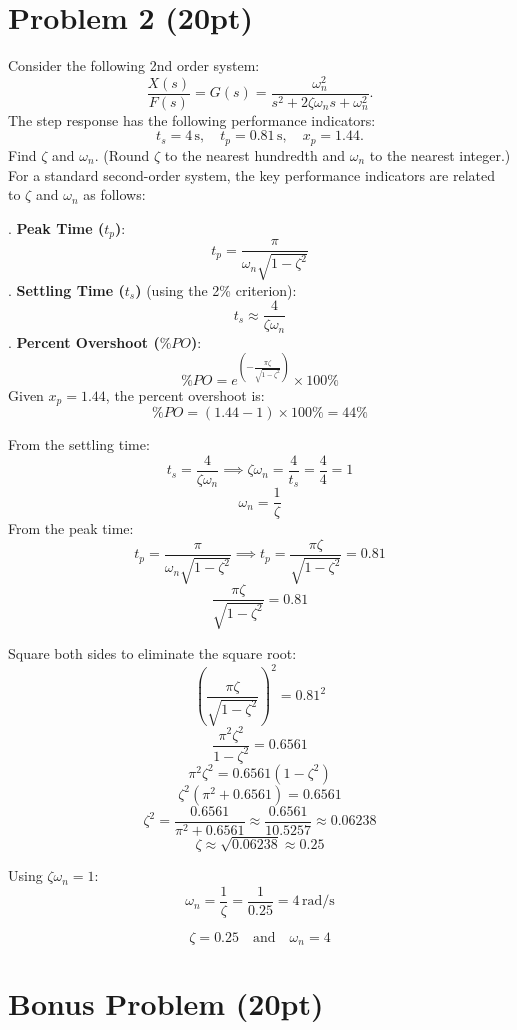 \documentclass{article}
\begin{document}
\section*{Problem 2 (20pt)}

Consider the following 2nd order system:
\[
\frac{X(s)}{F(s)} = G(s) = \frac{\omega_n^2}{s^2 + 2\zeta \omega_n s + \omega_n^2}.
\]
The step response has the following performance indicators: 
\[
t_s = 4 \, \text{s}, \quad t_p = 0.81 \, \text{s}, \quad x_p = 1.44.
\]
Find \( \zeta \) and \( \omega_n \). (Round \( \zeta \) to the nearest hundredth and \( \omega_n \) to the nearest integer.)
\newline\newline
For a standard second-order system, the key performance indicators are related to \( \zeta \) and \( \omega_n \) as follows:

. \textbf{Peak Time (\( t_p \))}:
   \[
   t_p = \frac{\pi}{\omega_n \sqrt{1 - \zeta^2}}
   \]
. \textbf{Settling Time (\( t_s \))} (using the 2\% criterion):
   \[
   t_s \approx \frac{4}{\zeta \omega_n}
   \]
. \textbf{Percent Overshoot (\( \%PO \))}:
   \[
   \%PO = e^{\left(-\frac{\pi \zeta}{\sqrt{1 - \zeta^2}}\right)} \times 100\%
   \]
   Given \( x_p = 1.44 \), the percent overshoot is:
   \[
   \%PO = (1.44 - 1) \times 100\% = 44\%
   \]

\noindent
From the settling time:
\[
t_s = \frac{4}{\zeta \omega_n} \implies \zeta \omega_n = \frac{4}{t_s} = \frac{4}{4} = 1
\]
\[
\omega_n = \frac{1}{\zeta}
\]
\noindent
From the peak time:
\[
t_p = \frac{\pi}{\omega_n \sqrt{1 - \zeta^2}} \implies t_p = \frac{\pi \zeta}{\sqrt{1 - \zeta^2}} = 0.81
\]
\[
\frac{\pi \zeta}{\sqrt{1 - \zeta^2}} = 0.81
\]

\noindent
Square both sides to eliminate the square root:
\[
\left(\frac{\pi \zeta}{\sqrt{1 - \zeta^2}}\right)^2 = 0.81^2
\]
\[
\frac{\pi^2 \zeta^2}{1 - \zeta^2} = 0.6561
\]
\[
\pi^2 \zeta^2 = 0.6561 (1 - \zeta^2)
\]
\[
\zeta^2 (\pi^2 + 0.6561) = 0.6561
\]
\[
\zeta^2 = \frac{0.6561}{\pi^2 + 0.6561} \approx \frac{0.6561}{10.5257} \approx 0.06238
\]
\[
\zeta \approx \sqrt{0.06238} \approx 0.25
\]

\noindent
Using \( \zeta \omega_n = 1 \):
\[
\omega_n = \frac{1}{\zeta} = \frac{1}{0.25} = 4 \, \text{rad/s}
\]

\[
\boxed{\,\zeta = 0.25 \quad \text{and} \quad \omega_n = 4\,}
\]



\newpage
\section*{Bonus Problem (20pt)}
\end{document}
